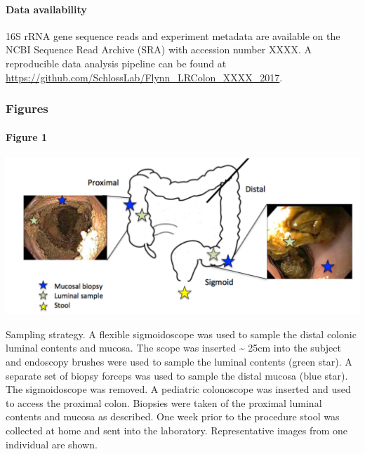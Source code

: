\documentclass[11pt,]{article}
\let\oldparagraph\paragraph
\renewcommand{\paragraph}[1]{\oldparagraph{#1}\mbox{}}
\begin{document}
\paragraph{Data availability}\label{data-availability}

16S rRNA gene sequence reads and experiment metadata are available on
the NCBI Sequence Read Archive (SRA) with accession number XXXX. A
reproducible data analysis pipeline can be found at
\url{https://github.com/SchlossLab/Flynn_LRColon_XXXX_2017}.

\newpage

\subsubsection{Figures}\label{figures}

\paragraph{Figure 1}\label{figure-1}

\includegraphics{../submission/figure_1.pdf}

Sampling strategy. A flexible sigmoidoscope was used to sample the
distal colonic luminal contents and mucosa. The scope was inserted
\textasciitilde{} 25cm into the subject and endoscopy brushes were used
to sample the luminal contents (green star). A separate set of biopsy
forceps was used to sample the distal mucosa (blue star). The
sigmoidoscope was removed. A pediatric colonoscope was inserted and used
to access the proximal colon. Biopsies were taken of the proximal
luminal contents and mucosa as described. One week prior to the
procedure stool was collected at home and sent into the laboratory.
Representative images from one individual are shown.

\newpage
\end{document}
